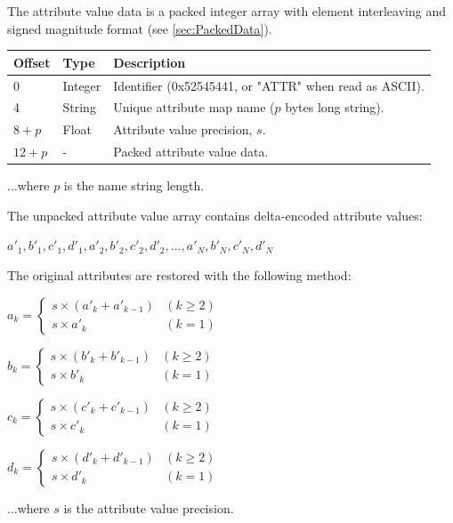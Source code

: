 The attribute value data is a packed integer array with element interleaving
and signed magnitude format (see \ref{sec:PackedData}).

\begin{tabular}{|l|l|l|}\hline
\textbf{Offset} &  \textbf{Type} & \textbf{Description}\\ \hline
0 & Integer & Identifier (0x52545441, or "ATTR" when read as ASCII).\\ \hline
4 & String & Unique attribute map name ($p$ bytes long string).\\ \hline
$8+p$ & Float & Attribute value precision, $s$.\\ \hline
$12+p$ & - & Packed attribute value data.\\ \hline
\end{tabular}

...where $p$ is the name string length.

The unpacked attribute value array contains delta-encoded attribute values:

$a'_1, b'_1, c'_1, d'_1, a'_2, b'_2, c'_2, d'_2, ..., a'_N, b'_N, c'_N, d'_N$

The original attributes are restored with the following method:

$a_k = \begin{cases}
s \times (a'_k + a'_{k-1}) & (k \geq 2)\\
s \times a'_k & (k = 1)
\end{cases}$

$b_k = \begin{cases}
s \times (b'_k + b'_{k-1}) & (k \geq 2)\\
s \times b'_k & (k = 1)
\end{cases}$

$c_k = \begin{cases}
s \times (c'_k + c'_{k-1}) & (k \geq 2)\\
s \times c'_k & (k = 1)
\end{cases}$

$d_k = \begin{cases}
s \times (d'_k + d'_{k-1}) & (k \geq 2)\\
s \times d'_k & (k = 1)
\end{cases}$

...where $s$ is the attribute value precision.


